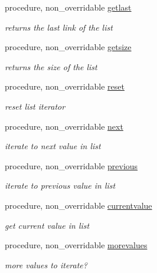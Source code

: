 \begin{DoxyCompactItemize}
procedure, non\+\_\+overridable \mbox{\hyperlink{structabstract__linkedlist__mod_1_1linkedlist_a17366518d094a62e8e68fa4c5681810c}{getlast}}
\begin{DoxyCompactList}\small\item\em returns the last link of the list \end{DoxyCompactList}\item 
procedure, non\+\_\+overridable \mbox{\hyperlink{structabstract__linkedlist__mod_1_1linkedlist_a18806ecb0fb5dea1e754de35d3700ab7}{getsize}}
\begin{DoxyCompactList}\small\item\em returns the size of the list \end{DoxyCompactList}\item 
procedure, non\+\_\+overridable \mbox{\hyperlink{structabstract__linkedlist__mod_1_1linkedlist_a3eb28d7a77ee8613ed566ec0148a1bd3}{reset}}
\begin{DoxyCompactList}\small\item\em reset list iterator \end{DoxyCompactList}\item 
procedure, non\+\_\+overridable \mbox{\hyperlink{structabstract__linkedlist__mod_1_1linkedlist_ae301aa96709e62ff823e9fd7c52ff517}{next}}
\begin{DoxyCompactList}\small\item\em iterate to next value in list \end{DoxyCompactList}\item 
procedure, non\+\_\+overridable \mbox{\hyperlink{structabstract__linkedlist__mod_1_1linkedlist_a655ba9438cdca6f2a52fd317e474fd70}{previous}}
\begin{DoxyCompactList}\small\item\em iterate to previous value in list \end{DoxyCompactList}\item 
procedure, non\+\_\+overridable \mbox{\hyperlink{structabstract__linkedlist__mod_1_1linkedlist_a01dda56c3e79f6e9f5b12df9a9ec192b}{currentvalue}}
\begin{DoxyCompactList}\small\item\em get current value in list \end{DoxyCompactList}\item 
procedure, non\+\_\+overridable \mbox{\hyperlink{structabstract__linkedlist__mod_1_1linkedlist_adac9f898125d07bacdee51f7beed0ec1}{morevalues}}
\begin{DoxyCompactList}\small\item\em more values to iterate? \end{DoxyCompactList}\end{DoxyCompactItemize}
